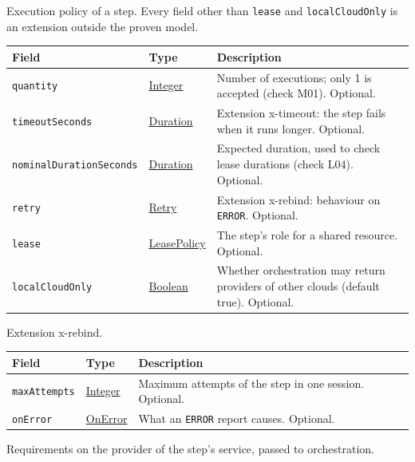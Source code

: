 \documentclass[a4paper]{arrowhead}
\newcommand{\mref}[1]{{\textcolor{ArrowheadPurple}{\hyperref[sec:model:#1]{#1}}}}
\newcommand{\pref}[1]{{\textcolor{ArrowheadGrey}{\hyperref[sec:model:primitives:#1]{#1}}}}
\begin{document}
Execution policy of a step. Every field other than \texttt{lease} and \texttt{localCloudOnly} is an extension outside the proven model.

{\small
\begin{longtable}{|p{3.9cm}|p{4.4cm}|p{7.5cm}|}

\hline
\rowcolor{gray!33} Field & Type & Description \\ \hline
\endhead
\texttt{quantity} & \pref{Integer} & Number of executions; only 1 is accepted (check M01). Optional. \\ \hline
\texttt{timeoutSeconds} & \pref{Duration} & Extension x-timeout: the step fails when it runs longer. Optional. \\ \hline
\texttt{nominalDurationSeconds} & \pref{Duration} & Expected duration, used to check lease durations (check L04). Optional. \\ \hline
\texttt{retry} & \mref{Retry} & Extension x-rebind: behaviour on \texttt{ERROR}. Optional. \\ \hline
\texttt{lease} & \mref{LeasePolicy} & The step's role for a shared resource. Optional. \\ \hline
\texttt{localCloudOnly} & \pref{Boolean} & Whether orchestration may return providers of other clouds (default true). Optional. \\ \hline
\end{longtable}
}

Extension x-rebind.

{\small
\begin{longtable}{|p{3.9cm}|p{4.4cm}|p{7.5cm}|}

\hline
\rowcolor{gray!33} Field & Type & Description \\ \hline
\endhead
\texttt{maxAttempts} & \pref{Integer} & Maximum attempts of the step in one session. Optional. \\ \hline
\texttt{onError} & \mref{OnError} & What an \texttt{ERROR} report causes. Optional. \\ \hline
\end{longtable}
}

Requirements on the provider of the step's service, passed to orchestration.
\end{document}
